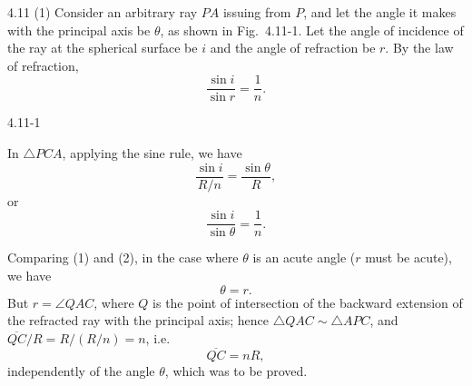 \begin{solution}{4.11}
(1) Consider an arbitrary ray $PA$ issuing from $P$, and let the angle it makes with the principal
axis be $\theta$, as shown in Fig.~4.11-1. Let the angle of incidence of the ray at the spherical
surface be $i$ and the angle of refraction be $r$. By the law of refraction,
\begin{equation}
\frac{\sin i}{\sin r} = \frac{1}{n}. \tag{1}
\end{equation}

\begin{figbox}{4.11-1}
\end{figbox}

In $\triangle PCA$, applying the sine rule, we have
\begin{equation*}
\frac{\sin i}{R/n} = \frac{\sin\theta}{R},
\end{equation*}
or
\begin{equation}
\frac{\sin i}{\sin\theta} = \frac{1}{n}. \tag{2}
\end{equation}

Comparing (1) and (2), in the case where $\theta$ is an acute angle ($r$ must be acute), we have
\begin{equation*}
\theta = r.
\end{equation*}
But $r=\angle QAC$, where $Q$ is the point of intersection of the backward extension of the
refracted ray with the principal axis; hence $\triangle QAC\sim\triangle APC$, and
$\overline{QC}/R=R/(R/n)=n$, i.e.
\begin{equation*}
\overline{QC} = nR,
\end{equation*}
independently of the angle $\theta$, which was to be proved.


\end{solution}
